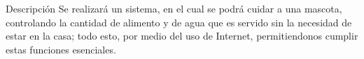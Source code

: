 Descripción
 Se realizará un sistema, en el cual se podrá cuidar a una mascota, controlando la cantidad de alimento y de agua que es servido sin la necesidad de estar en la casa; todo esto, por medio del uso de Internet, permitiendonos cumplir estas funciones esenciales.
